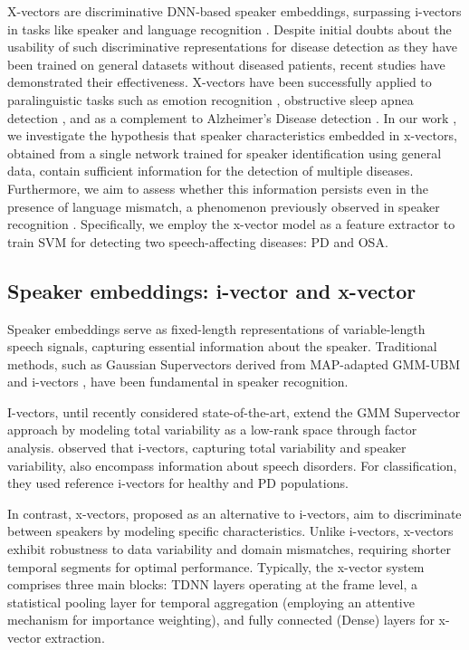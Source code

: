 X-vectors are discriminative \ac{DNN}-based speaker embeddings, surpassing i-vectors in tasks like speaker and language recognition \cite{snyder2018x}. Despite initial doubts about the usability of such discriminative representations for disease detection as they have been trained on general datasets without diseased patients, recent studies have demonstrated their effectiveness. X-vectors have been successfully applied to paralinguistic tasks such as emotion recognition \cite{pappagari2020x}, obstructive sleep apnea detection \cite{perero2019modeling}, and as a complement to Alzheimer’s Disease detection \cite{zargarbashi2019multi}. In our work \cite{botelho2020pathological}, we investigate the hypothesis that speaker characteristics embedded in x-vectors, obtained from a single network trained for speaker identification using general data, contain sufficient information for the detection of multiple diseases. Furthermore, we aim to assess whether this information persists even in the presence of language mismatch, a phenomenon previously observed in speaker recognition \cite{snyder2017deep}. Specifically, we employ the x-vector model as a feature extractor to train \ac{SVM} for detecting two speech-affecting diseases: \ac{PD} and  \ac{OSA}.

\subsection{Speaker embeddings: i-vector and x-vector}
Speaker embeddings serve as fixed-length representations of variable-length speech signals, capturing essential information about the speaker. Traditional methods, such as Gaussian Supervectors \cite{kenny2007joint} derived from \ac{MAP}-adapted \ac{GMM-UBM} \cite{reynolds2000speaker} and i-vectors \cite{dehak2010front}, have been fundamental in speaker recognition.

I-vectors, until recently considered state-of-the-art, extend the GMM Supervector approach by modeling total variability as a low-rank space through factor analysis. \cite{hauptman2019identifying} observed that i-vectors, capturing total variability and speaker variability, also encompass information about speech disorders. For classification, they used reference i-vectors for healthy and PD populations.

In contrast, x-vectors, proposed as an alternative to i-vectors, aim to discriminate between speakers by modeling specific characteristics. Unlike i-vectors, x-vectors exhibit robustness to data variability and domain mismatches, requiring shorter temporal segments for optimal performance. Typically, the x-vector system comprises three main blocks: \ac{TDNN} layers operating at the frame level, a statistical pooling layer for temporal aggregation (employing an attentive mechanism for importance weighting), and fully connected (Dense) layers for x-vector extraction.

